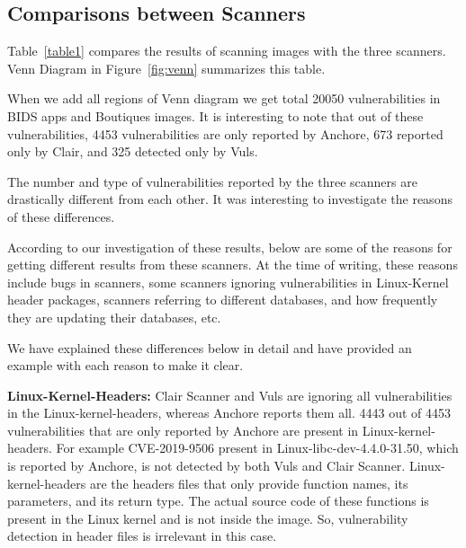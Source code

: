 \documentclass[a4paper,num-refs]{oup-contemporary}
\begin{document}
\subsection{Comparisons between Scanners}

Table~\ref{table1} compares the results of scanning images with the three scanners.
Venn Diagram in Figure~\ref{fig:venn} summarizes this table. 

When we add all regions of Venn diagram
we get total 20050 vulnerabilities in BIDS apps and Boutiques images.
It is interesting to note that out of these vulnerabilities, 4453 vulnerabilities are only
reported by Anchore, 673 reported only by Clair, and 325 detected only by Vuls.

The number and type of vulnerabilities reported by the three scanners are drastically different from each other.
It was interesting to investigate the reasons of these differences.

According to our investigation of these results, below are some of the reasons for
getting different results from these scanners. At the time of writing, these reasons include bugs in scanners,
some scanners ignoring vulnerabilities in Linux-Kernel header packages, scanners referring to different databases,
and how frequently they are updating their databases, etc. 

We have explained these differences below in detail
and have provided an example with each reason to make it clear.

\textbf{Linux-Kernel-Headers:} Clair Scanner and Vuls are ignoring all vulnerabilities in the Linux-kernel-headers,
whereas Anchore reports them all.
4443 out of 4453 vulnerabilities that are only reported by Anchore are present in Linux-kernel-headers.
For example CVE-2019-9506 present in Linux-libc-dev-4.4.0-31.50, which is reported by Anchore, is not
detected by both Vuls and Clair Scanner.
Linux-kernel-headers are the headers files that only provide function names, its parameters, and its
return type.
The actual source code of these functions is present in the Linux kernel and is not inside the image.
So, vulnerability detection in header files
is irrelevant in this case.
\end{document}
